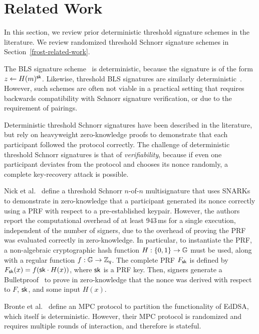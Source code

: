 \section{Related Work}

In this section,
we review prior deterministic threshold signature schemes in the literature.
We review randomized threshold Schnorr signature schemes in
Section~\ref{frost-related-work}.

The BLS signature scheme~\cite{BonehLS04} is deterministic,
because the signature is of the form $z \gets H(m)^{\mathsf{sk}}$.
Likewise, threshold BLS signatures are similarly deterministic~\cite{Boldyreva03}.
However, such schemes are often not viable in a practical setting that requires backwards compatibility with Schnorr signature verification,
or due to the requirement of pairings.

Deterministic threshold Schnorr signatures have been described in the literature,
but rely on heavyweight zero-knowledge proofs to demonstrate that each
participant followed the protocol correctly.
The challenge of deterministic threshold Schnorr signatures is that of \emph{verifiability},
because if even one participant deviates from the protocol and chooses its nonce randomly,
a complete key-recovery attack is possible.

\begin{sloppypar}
Nick et al.~\cite{NickRSW20} define a threshold Schnorr $n$-of-$n$ multisignature
that uses SNARKs to demonstrate in zero-knowledge that a participant
generated its nonce correctly using a PRF with respect to a pre-established keypair.
However, the authors report the computational overhead of at least 943\,ms for a single execution,
independent of the number of signers,
due to the overhead of proving the PRF was evaluated correctly in zero-knowledge.
In particular, to instantiate the PRF,
a non-algebraic cryptographic hash function $H : \{ 0, 1\} \rightarrow \mathbb{G}$ must be used,
along with a regular function $f : \mathbb{G} \rightarrow \mathbb{Z}_q$.
The complete PRF $F_{\mathsf{sk}}$ is defined by $F_{\mathsf{sk}}(x) = f( \mathsf{sk} \cdot H(x))$,
where $\mathsf{sk}$ is a PRF key.
Then, signers generate a Bulletproof~\cite{BunzBBPWM18} to prove in zero-knowledge
that the nonce was derived with respect to $F$, $\mathsf{sk}$, and some input $H(x)$.
\end{sloppypar}

Bronte et al.~\cite{BonteST21} define an MPC protocol to partition the functionality of EdDSA,
which itself is deterministic.
However, their MPC protocol is randomized and requires multiple rounds of interaction,
and therefore is stateful.


